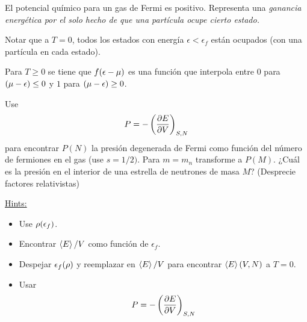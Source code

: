 El potencial químico para un gas de Fermi es positivo. Representa una \textit{ganancia energética por el solo hecho de que una partícula ocupe cierto estado.}

Notar que a $T=0$, todos los estados con energía $\epsilon<\epsilon_f$ están ocupados (con una partícula en cada estado).

Para $T\geq 0$ se tiene que $f(\epsilon-\mu )$ es una función que interpola entre $0$ para $(\mu-\epsilon)\leq 0$ y $1$ para $(\mu-\epsilon)\geq 0$.



\begin{ej}
	Use 
	\begin{equation}
  P=-\left(\pdv{E}{V}\right)_{S,N}
\end{equation}
para encontrar $P(N)$ la presión degenerada de Fermi como función del número de fermiones en el gas (use $s=1/2)$. Para $m=m_n$ transforme a $P(M)$. ¿Cuál es la presión en el interior de una estrella de neutrones de masa $M$? (Desprecie factores relativistas)

\underline{Hints:} \begin{itemize}
	\item Use $\rho (\epsilon_f)$.
	\item Encontrar $\ev{E}/V$ como función de $\epsilon_f$.
	\item Despejar $\epsilon_f(\rho )$ y reemplazar en $\ev{E}/V$ para encontrar $\ev{E}(V,N)$ a $T=0$.
	\item Usar 
	\begin{equation}\label{12.P}
  P=-\left(\pdv{E}{V}\right)_{S,N}
\end{equation}
\end{itemize}
\end{ej}

